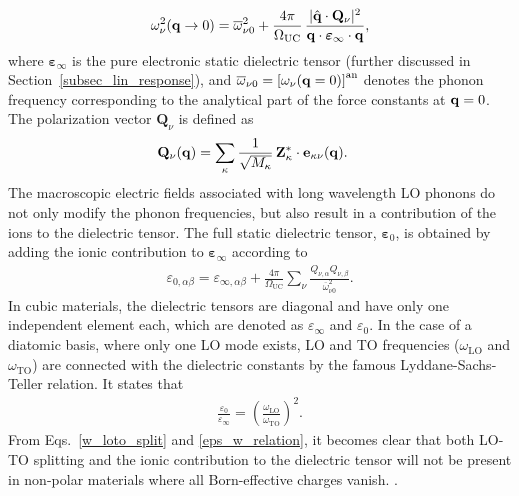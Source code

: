 %
\begin{align}\label{w_loto_split}
    \omega^2_\nu(\mathbf{q}\rightarrow0) =\overline{\omega}^2_{\nu 0} + \frac{4\pi}{\Omega_\text{UC}}\,\frac{|\hat{\mathbf{q}}\cdot\mathbf{Q}_{\nu}|^2}{\mathbf{q}\cdot\boldsymbol{\varepsilon}_\infty\cdot\mathbf{q}},
\end{align}
%
where $\boldsymbol{\varepsilon}_\infty$ is the pure electronic static dielectric tensor  (further discussed in Section~\ref{subsec_lin_response}), and $\overline{\omega}_{\nu 0} = \left[\omega_\nu(\mathbf{q}=0)\right]^\text{an}$ denotes the phonon frequency corresponding to the analytical part of the force constants at $\mathbf{q}=0$. The polarization vector $\mathbf{Q}_{\nu}$ is defined as
%
\begin{align}\label{pol_vec}
    \mathbf{Q}_{\nu}(\mathbf{q}) & = \sum_{\kappa} \frac{1}{\sqrt{M_\kappa }}\,\mathbf{Z}^*_\kappa\cdot \mathbf{e}_{\kappa\nu}(\mathbf{q}).
\end{align}
%
The macroscopic electric fields associated with long wavelength LO phonons do not only modify the phonon frequencies, but also result in a contribution of the ions to the dielectric tensor. The full static dielectric tensor, $\boldsymbol{\varepsilon}_0$, is obtained by adding the ionic contribution to  $\boldsymbol{\varepsilon}_\infty$ according to\cite{gonze_lee}
%
\begin{align}\label{eps_w_relation}
    \varepsilon_{0,\alpha\beta} = \varepsilon_{\infty,\alpha\beta} + \frac{4\pi}{\Omega_\text{UC}}\sum_\nu\frac{Q_{\nu,\alpha}Q_{\nu,\beta}}{\overline{\omega}^2_{\nu 0}}.
\end{align}
%
In cubic materials, the dielectric tensors are diagonal and have only one independent element each, which are denoted as $\varepsilon_\infty$ and $\varepsilon_0$. In the case of a diatomic basis, where \newpage only one LO mode exists, LO and TO frequencies ($\omega^{\phantom{I}}_\text{LO}$ and $\omega^{\phantom{I}}_\text{TO}$) are connected with the dielectric constants by the famous Lyddane-Sachs-Teller relation\cite{lst_rel}. It states that
%
\begin{align}\label{lst}
    \frac{\varepsilon_0}{\varepsilon_\infty} = \left(\frac{\omega^{\phantom{I}}_\text{LO}}{\omega^{\phantom{I}}_\text{TO}}\right)^{\!\!2}.
\end{align}
From Eqs.~\eqref{w_loto_split} and \eqref{eps_w_relation}, it becomes clear that both  LO-TO splitting and the ionic contribution to the dielectric tensor will not be present in non-polar materials where all Born-effective charges vanish.
 \newpage
 \phantom.
\vspace{3cm}
